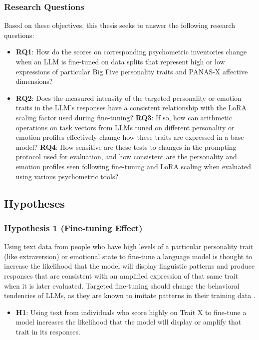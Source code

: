 \documentclass{DESSThesis}
\begin{document}
\subsubsection{Research Questions}
Based on these objectives, this thesis seeks to answer the following research questions:
\begin{itemize}
\item \textbf{RQ1}: How do the scores on corresponding psychometric inventories change when an LLM is fine-tuned on data splits that represent high or low expressions of particular Big Five personality traits and PANAS-X affective dimensions?
\item \textbf{RQ2}: Does the measured intensity of the targeted personality or emotion traits in the LLM's responses have a consistent relationship with the LoRA scaling factor used during fine-tuning?
\textbf{RQ3}: If so, how can arithmetic operations on task vectors from LLMs tuned on different personality or emotion profiles effectively change how these traits are expressed in a base model?
\textbf{RQ4}: How sensitive are these tests to changes in the prompting protocol used for evaluation, and how consistent are the personality and emotion profiles seen following fine-tuning and LoRA scaling when evaluated using various psychometric tools?
\end{itemize}

\subsection{Hypotheses}

\subsubsection{Hypothesis 1 (Fine-tuning Effect)}
Using text data from people who have high levels of a particular personality trait (like extraversion) or emotional state to fine-tune a language model is thought to increase the likelihood that the model will display linguistic patterns and produce responses that are consistent with an amplified expression of that same trait when it is later evaluated. Targeted fine-tuning should change the behavioral tendencies of LLMs, as they are known to imitate patterns in their training data \cite{jiang_evaluating_2023,pan_llms_2023,safdari_personality_2023}.
\begin{itemize}
\item \textbf{H1}: Using text from individuals who score highly on Trait X to fine-tune a model increases the likelihood that the model will display or amplify that trait in its responses.
\end{itemize}
\end{document}
